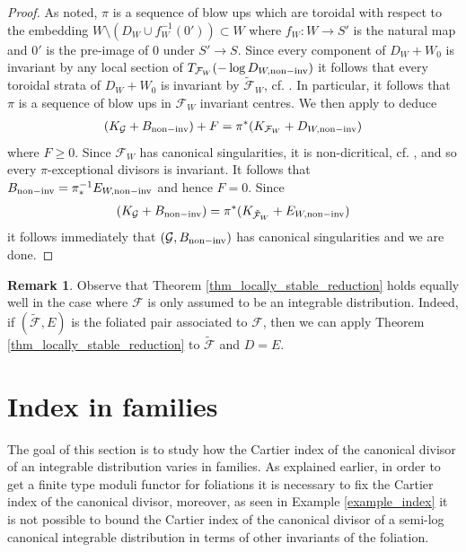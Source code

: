 \documentclass[12pt, a4paper]{amsart}
\newcounter{Theorem}
\theoremstyle{definition}
\newtheorem{remark}[theorem]{Remark}
\theoremstyle{named}
\begin{document}
\begin{proof}
As noted, $\pi$ is a sequence of blow ups
which are toroidal with respect to the embedding $W \setminus (D_W \cup f_W^{-1}(0')) \subset W$
where $f_W \colon W \to S'$ is the natural map and $0'$ is the pre-image of $0$ under $S' \to S$.
Since every component of $D_W+W_0$ is invariant by any local section of  $T_{\mathcal F_W}(-\log D_{W, {\rm non-inv}})$ 
it follows
that every toroidal strata of $D_W+W_0$ is invariant by $\tilde{\mathcal F}_W$, cf. \cite[Theorem 5]{MR0212027}.  
In particular, it follows that $\pi$ is a sequence of blow ups in $\mathcal F_W$ invariant centres.
We then apply \cite[Proposition I.2.4]{bm16} to deduce
 \begin{align*}(K_{\mathcal G}+B_{{\rm non-inv}})+F= 
 \pi^*(K_{\mathcal F_W}+D_{W, {\rm non-inv}})\end{align*} where $F \ge 0$.
Since $\mathcal F_W$ has canonical singularities, it is non-dicritical, cf. \cite[Corollary III.i.4]{MP13}, and so every $\pi$-exceptional divisors is invariant. It follows that $B_{{\rm non-inv}} 
= \pi_*^{-1}E_{W, {\rm non-inv}}$ and hence $F = 0$.
  Since
 \begin{align*}(K_{\mathcal G}+B_{{\rm non-inv}})= 
 \pi^*(K_{\tilde{\mathcal F}_W}+E_{W, {\rm non-inv}})\end{align*}
 it follows immediately that $(\mathcal G, B_{{\rm non-inv}})$ has canonical singularities
 and we are done.
\end{proof}

\begin{remark}
    Observe that Theorem \ref{thm_locally_stable_reduction} holds equally well in the case where $\mathcal F$ is only assumed to be 
    an integrable distribution.  Indeed, if $(\tilde{\mathcal F}, E)$ is the foliated pair associated to $\mathcal F$, then we can apply Theorem \ref{thm_locally_stable_reduction} to $\tilde{\mathcal F}$ and $D = E$.
    \end{remark}

\section{Index in families}
\label{s_index_families}
The goal of this section is to study how the Cartier index of the canonical divisor of an integrable distribution varies in families.
As explained earlier, in order to get a finite type moduli functor for foliations it is necessary to fix the Cartier index of the canonical divisor, moreover, as seen in Example \ref{example_index} it is not possible to bound the Cartier index of the canonical divisor of a semi-log canonical integrable distribution in terms of other invariants of the foliation.  
\end{document}

